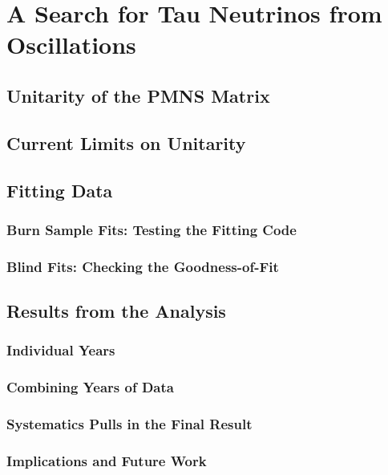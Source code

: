 \chapter{A Search for Tau Neutrinos from Oscillations}

\label{sec:unitarity}
\section{Unitarity of the PMNS Matrix}

\label{sec:current_limits}
\section{Current Limits on Unitarity}

\label{sec:mc_expectation}


\label{sec:tau_parametrization}


\label{sec:systematics}


\label{sec:likelihood}


\label{sec:sensitivity}


\label{sec:fitting_data}
\section{Fitting Data}

\label{subsec:burn_sample}
\subsection{Burn Sample Fits: Testing the Fitting Code}

\label{subsec:blind_fits}
\subsection{Blind Fits: Checking the Goodness-of-Fit}

\label{section:tau_results}
\section{Results from the Analysis}

\label{subsec:single_year_results}
\subsection{Individual Years}

\label{subsec:multi_year_results}
\subsection{Combining Years of Data}

\label{subsec:systematics_result}
\subsection{Systematics Pulls in the Final Result}

\label{subsec:implications}
\subsection{Implications and Future Work}
